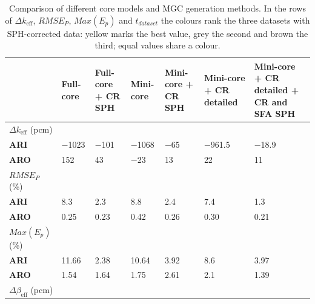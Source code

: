 \begin{table}[h!]
\centering
\caption[Comparison of core models and MGC generation methods]{Comparison of different core models and MGC generation methods. In the rows of $\Delta k_{\mathrm{eff}}$, $RMSE_P$, $Max(E_p)$ and $t_{dataset}$ the colours rank the three datasets with SPH-corrected data: yellow marks the best value, grey the second and brown the third; equal values share a colour.}
\label{sph:tab:all_results_table}
\small
\setlength{\tabcolsep}{4pt}
\begin{tabular}{
    @{}p{24mm}
    >{\centering\arraybackslash}p{15mm} %
    >{\centering\arraybackslash}p{15mm} %
    >{\centering\arraybackslash}p{15mm} %
    >{\centering\arraybackslash}p{15mm} %
    >{\centering\arraybackslash}p{15mm} %
    >{\centering\arraybackslash}p{15mm}@{} %
}
\toprule
\textbf{} & \textbf{Full-core} & \textbf{Full-core + CR SPH} & \textbf{Mini-core} & \textbf{Mini-core + CR SPH} & \textbf{Mini-core + CR detailed} & \textbf{Mini-core + CR detailed + CR and SFA SPH} \\
\midrule
{{$\Delta k_{\mathrm{eff}}$} (pcm)} \\
\textbf{ARI} & \num{-1023} & \cellcolor{brown}\num{-101} & \num{-1068} & \cellcolor{gray}\num{-65} & \num{-961.5} & \cellcolor{yellow}\num{-18.9} \\
\textbf{ARO} & \num{152} & \cellcolor{brown}\num{43} & \num{-23} & \cellcolor{gray}\num{13} & \num{22} & \cellcolor{yellow}\num{11} \\
\addlinespace
{$RMSE_P$ (\%)} \\
\textbf{ARI} & \num{8.3} & \cellcolor{gray}\num{2.3} & \num{8.8} & \cellcolor{brown}\num{2.4} & \num{7.4} & \cellcolor{yellow}\num{1.3} \\
\textbf{ARO} & \num{0.25} & \cellcolor{gray}\num{0.23} & \num{0.42} & \cellcolor{brown}\num{0.26} & \num{0.30} & \cellcolor{yellow}\num{0.21} \\
\addlinespace
{$Max(E_p)$ (\%)} \\
\textbf{ARI} & \num{11.66} & \cellcolor{yellow}\num{2.38} & \num{10.64} & \cellcolor{gray}\num{3.92} & \num{8.6} & \cellcolor{brown}\num{3.97} \\
\textbf{ARO} & \num{1.54} & \cellcolor{gray}\num{1.64} & \num{1.75} & \cellcolor{brown}\num{2.61} & \num{2.1} & \cellcolor{yellow}\num{1.39} \\
\addlinespace
{$\Delta \beta_{\mathrm{eff}}$ (pcm)} \\

\end{tabular}
\end{table}
